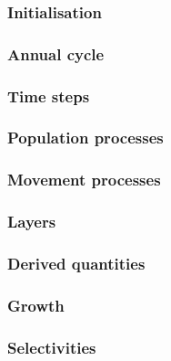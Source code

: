 
\subsubsection{Initialisation}

\subsubsection{Annual cycle}

\subsubsection{Time steps}

\subsubsection{Population processes}

\subsubsection{Movement processes}

\subsubsection{Layers}

\subsubsection{Derived quantities}

\subsubsection{Growth}

\subsubsection{Selectivities}


